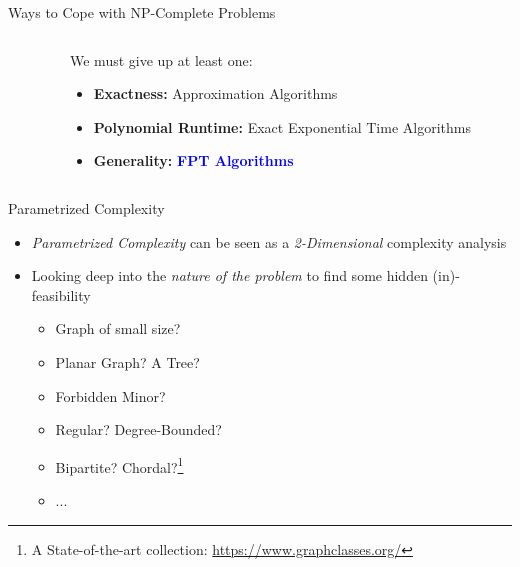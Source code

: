 \begin{frame}[c]{Ways to Cope with NP-Complete Problems}
\begin{columns}[c]
    \begin{column}{.48\textwidth}
\begin{center}
\end{center}
\end{column}
    \begin{column}{.48\textwidth}
    We must give up at least one:
    
    \begin{itemize}
        \pause\item \textbf{Exactness: } Approximation Algorithms
        \pause\item \textbf{Polynomial Runtime: } Exact Exponential Time Algorithms 
        \pause\item \textbf{Generality: } \textcolor{blue}{\textbf{FPT Algorithms}}
    \end{itemize}
    \end{column}
\end{columns}
\end{frame}



\begin{frame}[c]{Parametrized Complexity}
\begin{itemize}
    \item \textit{Parametrized Complexity} can be seen as a \textit{2-Dimensional} complexity analysis
    \item Looking deep into the \textit{nature of the problem} to find some hidden (in)-feasibility
    \begin{itemize}
        \item Graph of small size?
        \item Planar Graph? A Tree?
        \item Forbidden Minor?
        \item Regular? Degree-Bounded?
        \item Bipartite? Chordal?\footnote{A State-of-the-art collection: \url{https://www.graphclasses.org/}}
        \item ...
    \end{itemize}
\end{itemize}
\end{frame}

